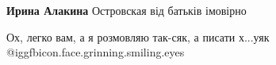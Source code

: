  
 
 
 
 

\begin{itemize}
 
\textbf{Ирина Алакина} Островская від батьків імовірно
\end{itemize}

 
Ох, легко вам, а я розмовляю так-сяк, а писати х...уяк @igg{fbicon.face.grinning.smiling.eyes} 

